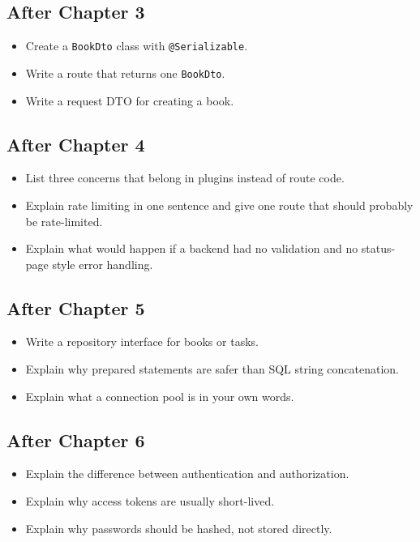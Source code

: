 \documentclass[11pt,a4paper]{article}
\begin{document}
\subsection{After Chapter 3}

\begin{itemize}
    \item Create a \texttt{BookDto} class with \texttt{@Serializable}.
    \item Write a route that returns one \texttt{BookDto}.
    \item Write a request DTO for creating a book.
\end{itemize}

\subsection{After Chapter 4}

\begin{itemize}
    \item List three concerns that belong in plugins instead of route code.
    \item Explain rate limiting in one sentence and give one route that should probably be rate-limited.
    \item Explain what would happen if a backend had no validation and no status-page style error handling.
\end{itemize}

\subsection{After Chapter 5}

\begin{itemize}
    \item Write a repository interface for books or tasks.
    \item Explain why prepared statements are safer than SQL string concatenation.
    \item Explain what a connection pool is in your own words.
\end{itemize}

\subsection{After Chapter 6}

\begin{itemize}
    \item Explain the difference between authentication and authorization.
    \item Explain why access tokens are usually short-lived.
    \item Explain why passwords should be hashed, not stored directly.
\end{itemize}
\end{document}
